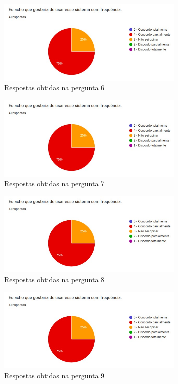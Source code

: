 \documentclass[12pt]{tcc}
\begin{document}
\begin{figure}[!ht]
	\centering
	\includegraphics[width=0.8\textwidth]{figures/respostas-pergunta-6.jpeg}
	\caption{Respostas obtidas na pergunta 6}
	\label{fig:respostas-pergunta-6}
\end{figure}

\begin{figure}[!ht]
	\centering
	\includegraphics[width=0.8\textwidth]{figures/respostas-pergunta-7.jpeg}
	\caption{Respostas obtidas na pergunta 7}
	\label{fig:respostas-pergunta-7}
\end{figure}


\begin{figure}[!ht]
	\centering
	\includegraphics[width=0.8\textwidth]{figures/respostas-pergunta-8.jpeg}
	\caption{Respostas obtidas na pergunta 8}
	\label{fig:respostas-pergunta-8}
\end{figure}

\begin{figure}[!ht]
	\centering
	\includegraphics[width=0.8\textwidth]{figures/respostas-pergunta-9.jpeg}
	\caption{Respostas obtidas na pergunta 9}
	\label{fig:respostas-pergunta-9}
\end{figure}
\end{document}
